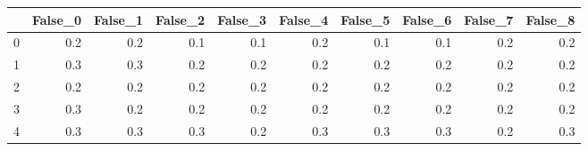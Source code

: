 \begin{tabular}{lrrrrrrrrr}
\toprule
{} &  False\_0 &  False\_1 &  False\_2 &  False\_3 &  False\_4 &  False\_5 &  False\_6 &  False\_7 &  False\_8 \\ \hline
\midrule
0 &      0.2 &      0.2 &      0.1 &      0.1 &      0.2 &      0.1 &      0.1 &      0.2 &      0.2 \\ \hline
1 &      0.3 &      0.3 &      0.2 &      0.2 &      0.2 &      0.2 &      0.2 &      0.2 &      0.2 \\ \hline
2 &      0.2 &      0.2 &      0.2 &      0.2 &      0.2 &      0.2 &      0.2 &      0.2 &      0.2 \\ \hline
3 &      0.3 &      0.2 &      0.2 &      0.2 &      0.2 &      0.2 &      0.2 &      0.2 &      0.2 \\ \hline
4 &      0.3 &      0.3 &      0.3 &      0.2 &      0.3 &      0.3 &      0.3 &      0.2 &      0.3 \\ \hline
\bottomrule
\end{tabular}
